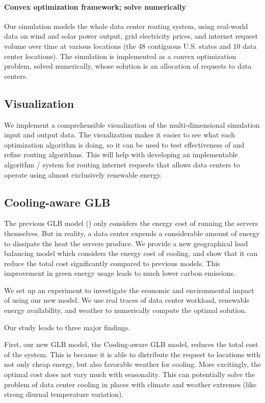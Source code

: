 \documentclass{acm_proc_article-sp}
\begin{document}
		\paragraph{Convex optimization framework; solve numerically}
			Our simulation models the whole data center routing system, using real-world data on wind and solar power output, grid electricity prices, and internet request volume over time at various locations (the 48 contiguous U.S. states and 10 data center locations). The simulation is implemented as a convex optimization problem, solved numerically, whose solution is an allocation of requests to data centers.
		



\subsection{Visualization}
We implement a comprehensible visualization of the multi-dimensional simulation input and output data. The visualization makes it easier to see what each optimization algorithm is doing, so it can be used to test effectiveness of and refine routing algorithms. This will help with developing an implementable algorithm / system for routing internet requests that allows data centers to operate using almost exclusively renewable energy.

\subsection{Cooling-aware GLB}
The previous GLB model (\cite{adam:GLB}) only considers the energy cost of running the servers themselves. But in reality, a data center expends a considerable amount of energy to dissipate the heat the servers produce. We provide a new geographical load balancing model which considers the energy cost of cooling, and show that it can reduce the total cost significantly compared to previous models. This improvement in green energy usage leads to much lower carbon emissions.

We set up an experiment to investigate the economic and environmental impact of using our new model. We use real traces of data center workload, renewable energy availability, and weather to numerically compute the optimal solution.%

Our study leads to three major findings.

First, our new GLB model, the Cooling-aware GLB model, reduces the total cost of the system. This is because it is able to distribute the request to locations with not only cheap energy, but also favorable weather for cooling. More excitingly, the optimal cost does not vary much with seasonality. This can potentially solve the problem of data center cooling in places with climate and weather extremes (like strong diurnal temperature variation).
\end{document}
